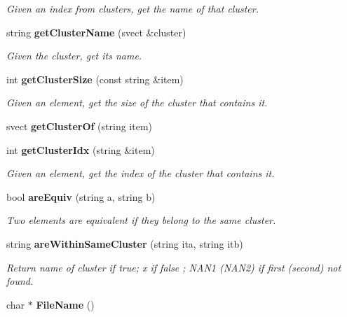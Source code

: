 \begin{CompactItemize}
\begin{CompactList}\small\item\em Given an index from clusters, get the name of that cluster. \item\end{CompactList}\item 
string {\bf get\-Cluster\-Name} (svect \&cluster)\label{classPartition_a49}

\begin{CompactList}\small\item\em Given the cluster, get its name. \item\end{CompactList}\item 
int {\bf get\-Cluster\-Size} (const string \&item)\label{classPartition_a50}

\begin{CompactList}\small\item\em Given an element, get the size of the cluster that contains it. \item\end{CompactList}\item 
svect {\bf get\-Cluster\-Of} (string item)
\item 
int {\bf get\-Cluster\-Idx} (string \&item)\label{classPartition_a52}

\begin{CompactList}\small\item\em Given an element, get the index of the cluster that contains it. \item\end{CompactList}\item 
bool {\bf are\-Equiv} (string a, string b)\label{classPartition_a53}

\begin{CompactList}\small\item\em Two elements are equivalent if they belong to the same cluster. \item\end{CompactList}\item 
string {\bf are\-Within\-Same\-Cluster} (string ita, string itb)\label{classPartition_a54}

\begin{CompactList}\small\item\em Return name of cluster if true; x if false ; NAN1 (NAN2) if first (second) not found. \item\end{CompactList}\item 
char $\ast$ {\bf File\-Name} ()\label{classPartition_a55}


\end{CompactItemize}
